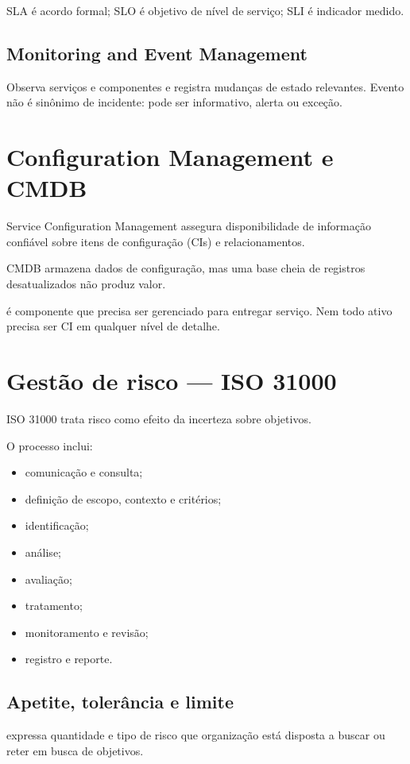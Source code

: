 SLA é acordo formal; SLO é objetivo de nível de serviço; SLI é indicador medido.

\subsection{Monitoring and Event Management}

Observa serviços e componentes e registra mudanças de estado relevantes. Evento não é sinônimo de incidente: pode ser informativo, alerta ou exceção.

\section{Configuration Management e CMDB}

Service Configuration Management assegura disponibilidade de informação confiável sobre itens de configuração (CIs) e relacionamentos.

CMDB armazena dados de configuração, mas uma base cheia de registros desatualizados não produz valor.

 é componente que precisa ser gerenciado para entregar serviço. Nem todo ativo precisa ser CI em qualquer nível de detalhe.

\section{Gestão de risco — ISO 31000}

ISO 31000 trata risco como efeito da incerteza sobre objetivos.

O processo inclui:
\begin{itemize}
\item comunicação e consulta;
\item definição de escopo, contexto e critérios;
\item identificação;
\item análise;
\item avaliação;
\item tratamento;
\item monitoramento e revisão;
\item registro e reporte.
\end{itemize}

\subsection{Apetite, tolerância e limite}

 expressa quantidade e tipo de risco que organização está disposta a buscar ou reter em busca de objetivos.

